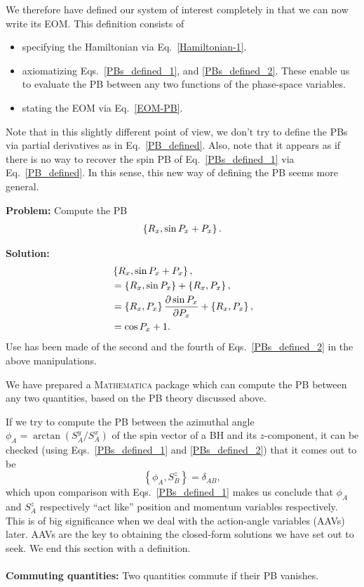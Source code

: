 We therefore have defined our system of interest completely in that 
we can now write its EOM. This definition consists of
\begin{itemize}
\item specifying the Hamiltonian via Eq.~\eqref{Hamiltonian-1}.
\item axiomatizing Eqs.~\eqref{PBs_defined_1}, and \eqref{PBs_defined_2}.
 These enable us to evaluate the PB between any 
two functions of the phase-space variables.
\item stating the EOM via Eq.~\eqref{EOM-PB}.
\end{itemize}
Note that in this slightly different point of view,
we don't try to define the PBs via partial derivatives 
as in Eq.~\eqref{PB_defined}. Also, note that it appears as if there is no way
to recover the spin PB of Eq.~\eqref{PBs_defined_1} via Eq.~\eqref{PB_defined}.
In this sense, this new way of defining the PB seems more general.





\begin{Exercise}    \label{exercise-1}
\textbf{Problem:} Compute the PB 
\begin{align}
\left\lbrace R_x , \sin  P_x   +   P_x   \right\rbrace.
\end{align}

\textbf{Solution:} 
\begin{align}
& \left\lbrace R_x , \sin  P_x   +   P_x   \right\rbrace  ,   \\ 
& =  \left\lbrace R_x,  \sin  P_x   \right\rbrace  +  \left\lbrace R_x,   P_x   \right\rbrace  ,  \\
& =  \left\lbrace R_x,    P_x   \right\rbrace  \frac{\partial \sin P_x}{\partial P_x}  +  \left\lbrace R_x,   P_x   \right\rbrace  ,  \\
&  =   \cos P_x + 1.
\end{align}
Use has been made of the second and the fourth of Eqs.~\eqref{PBs_defined_2}
in the above manipulations.
\end{Exercise}


We have prepared a
\textsc{Mathematica} package \cite{MMA1}
which can compute the PB between any two quantities,
based on the PB theory discussed above.




If we try to compute the PB between the azimuthal angle 
$\phi_{A} = \arctan (S_A^y/S_A^x)$ of the spin vector
of a BH and its $z$-component, it can be checked (using 
Eqs.~\eqref{PBs_defined_1} and \eqref{PBs_defined_2}) that it comes out to be
\begin{equation}
\left\{\phi_{A}, S_{B}^{z}\right\}=\delta_{A B}  ,     \label{spin-PB}
\end{equation}
which upon comparison with Eqs.~\eqref{PBs_defined_1}
makes us conclude that $\phi_A$ and $S_{A}^{z}$ respectively ``act
like'' position and momentum variables respectively. This is of big significance 
when we deal with the action-angle variables (AAVs) later. AAVs are the key
to obtaining the closed-form solutions we have set out to seek. 
We end this section 
with a definition. \\ \\
\textbf{Commuting quantities: } Two quantities {commute} if their PB vanishes.


